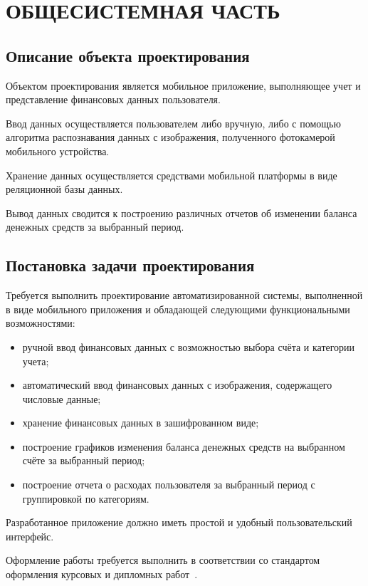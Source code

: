\section[Общесистемная часть]{ОБЩЕСИСТЕМНАЯ ЧАСТЬ}

\subsection{Описание объекта проектирования}

Объектом проектирования является мобильное приложение,
выполняющее учет и представление финансовых данных пользователя.

Ввод данных осуществляется пользователем либо вручную,
либо с помощью алгоритма распознавания данных с изображения,
полученного фотокамерой мобильного устройства.

Хранение данных осуществляется средствами мобильной платформы в
виде реляционной базы данных.

Вывод данных сводится к построению различных отчетов об изменении
баланса денежных средств за выбранный период.

\subsection{Постановка задачи проектирования}

Требуется выполнить проектирование автоматизированной системы,
выполненной в виде мобильного приложения и обладающей следующими
функциональными возможностями:
\begin{itemize}
\item ручной ввод финансовых данных с возможностью выбора счёта и
  категории учета;
\item автоматический ввод финансовых данных с изображения,
  содержащего числовые данные;
\item хранение финансовых данных в зашифрованном виде;
\item построение графиков изменения баланса денежных средств
  на выбранном счёте за выбранный период;
\item построение отчета о расходах пользователя
  за выбранный период с группировкой по категориям.
\end{itemize}

Разработанное приложение должно иметь простой и удобный
пользовательский интерфейс.

Оформление работы требуется выполнить в соответствии
со стандартом оформления курсовых и дипломных работ~\cite{stp2013}.

